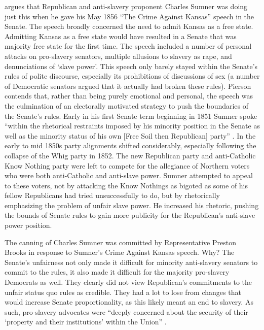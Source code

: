 \documentclass[a4paper]{article}\usepackage[]{graphicx}\usepackage[]{color}
\begin{document}
\cite{Pierson1995} argues that Republican and anti-slavery proponent Charles Sumner was doing just this when he gave his May 1856 ``The Crime Against Kansas'' speech in the Senate. The speech broadly concerned the need to admit Kansas as a free state. Admitting Kansas as a free state would have resulted in a Senate that was majority free state for the first time. The speech included a number of personal attacks on pro-slavery senators, multiple allusions to slavery as rape, and denunciations of `slave power'. This speech only barely stayed within the Senate's rules of polite discourse, especially its prohibitions of discussions of sex (a number of Democratic senators argued that it actually had broken these rules). Pierson contends that, rather than being purely emotional and personal, the speech was the culmination of an electorally motivated strategy to push the boundaries of the Senate's rules. Early in his first Senate term beginning in 1851 Sumner spoke ``within the rhetorical restraints imposed by his minority position in the Senate as well as the minority status of his own [Free Soil then Republican] party'' \cite[534]{Pierson1995}. In the early to mid 1850s party alignments shifted considerably, especially following the collapse of the Whig party in 1852. The new Republican party and anti-Catholic Know Nothing party were left to compete for the allegiance of Northern voters who were both anti-Catholic and anti-slave power. Sumner attempted to appeal to these voters, not by attacking the Know Nothings as bigoted as some of his fellow Republicans had tried unsuccessfully to do, but by rhetorically emphasizing the problem of unfair slave power. He increased his rhetoric, pushing the bounds of Senate rules to gain more publicity for the Republican's anti-slave power position.   

The canning of Charles Sumner was committed by Representative Preston Brooks in response to Sumner's Crime Against Kansas speech. Why? The Senate's unfairness not only made it difficult for minority anti-slavery senators to commit to the rules, it also made it difficult for the majority pro-slavery Democrats as well. They clearly did not view Republican's commitments to the unfair status quo rules as credible. They had a lot to lose from changes that would increase Senate proportionality, as this likely meant an end to slavery. As such, pro-slavery advocates were ``deeply concerned about the security of their `property and their institutions' within the Union'' \cite[281]{Mittal2013}. 
\end{document}

